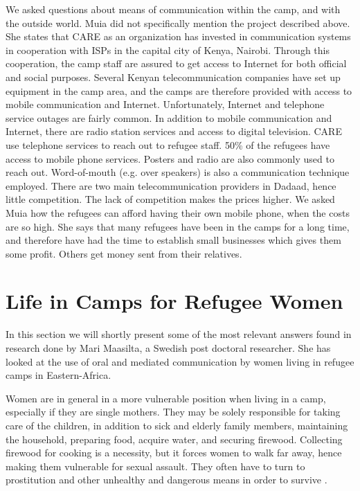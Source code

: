 We asked questions about means of communication within the camp, and with the outside world. Muia did not specifically mention the project described above. She states that CARE as an organization has invested in communication systems in cooperation with ISPs in the capital city of Kenya, Nairobi. Through this cooperation, the camp staff are assured to get access to Internet for both official and social purposes. Several Kenyan telecommunication companies have set up equipment in the camp area, and the camps are therefore provided with access to mobile communication and Internet. Unfortunately, Internet and telephone service outages are fairly common. In addition to mobile communication and Internet, there are radio station services and access to digital television. CARE use telephone services to reach out to refugee staff. 50\% of the refugees have access to mobile phone services. Posters and radio are also commonly used to reach out. Word-of-mouth (e.g. over speakers) is also a communication technique employed. There are two main telecommunication providers in Dadaad, hence little competition. The lack of competition makes the prices higher. We asked Muia how the refugees can afford having their own mobile phone, when the costs are so high. She says that many refugees have been in the camps for a long time, and therefore have had the time to establish small businesses which gives them some profit. Others get money sent from their relatives. 


\section{Life in Camps for Refugee Women}
In this section we will shortly present some of the most relevant answers found in research done by Mari Maasilta, a Swedish post doctoral researcher. She has looked at the use of oral and mediated communication by women living in refugee camps in Eastern-Africa. 

Women are in general in a more vulnerable position when living in a  camp, especially if they are single mothers. They may be solely responsible for taking care of the children, in addition to sick and elderly family members, maintaining the household, preparing food, acquire water, and securing firewood. Collecting firewood for cooking is a necessity, but it forces women  to walk far away, hence making them vulnerable for sexual assault. They often have to turn to prostitution and other unhealthy and dangerous means in order to survive \cite{womenRefugee}. 


